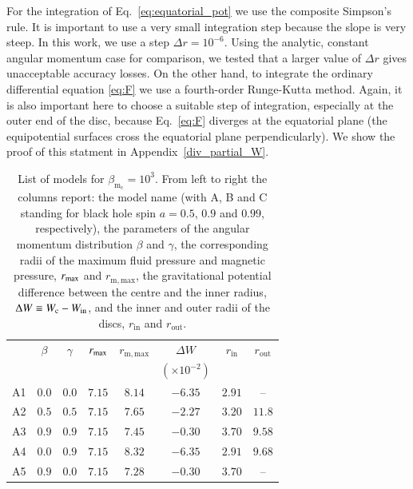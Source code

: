 \documentclass{aa}
\begin{document}
For the integration of Eq.~\eqref{eq:equatorial_pot} we use the composite Simpson's rule. It is important to use a very small integration step because the slope is very steep. In this work, we use a step $\Delta r = 10^{-6}$. Using the analytic, constant angular momentum case for comparison, we tested that 
a larger value of $\Delta r$ gives unacceptable accuracy losses. On the other hand, to integrate the ordinary differential equation \eqref{eq:F} we use a fourth-order Runge-Kutta method. Again, it is also important here to choose a suitable step of integration, especially at the outer end of the disc, because Eq.~\eqref{eq:F} diverges at the equatorial plane (the equipotential surfaces cross the equatorial plane perpendicularly). We show the proof of this statment in Appendix~\ref{div_partial_W}.

\begin{table}
\caption{List of models for $\beta_{\mathrm{m}_{\mathrm{c}}} = 10^{3}$. From left to right the columns report: the model name (with A, B and C standing for black hole spin $a = 0.5$, $0.9$ and $0.99$, respectively), the parameters of the angular momentum distribution $\beta$ and $\gamma$, the corresponding radii of the maximum fluid pressure and magnetic pressure, $r_{{\rm{max}}}$ and $r_{{\mathrm{m, max}}}$, the gravitational potential difference between the centre and the inner radius, $\Delta W\equiv W_{\rm c}-W_{\rm in}$, and the inner and outer radii of the discs, $r_{\mathrm{in}}$ and $r_{\mathrm{out}}$.}             
\label{table:1}      
\centering          
\begin{tabular}{c c c c  c c c c}
\hline\hline       
 & $\beta$ & $\gamma$ & $r_{\rm{max}}$ &  $r_{\mathrm{m, max}}$ & $\Delta W$               & $r_{\mathrm{in}}$ & $r_{\mathrm{out}}$ \\ 
 &              &                   &                          &                                        & $(\times 10^{-2})$     &                              &  \\
\hline           
A1 & $0.0$ & $0.0$ & $7.15$ &  $8.14$  & $-6.35$ & $2.91$ & -- \\ 
A2 & $0.5$ & $0.5$ & $7.15$ &  $7.65$  & $-2.27$ & $3.20$ & $11.8$\\ 
A3 & $0.9$ & $0.9$ & $7.15$ &  $7.45$  & $-0.30$ & $3.70$ &  $9.58$\\ 
A4 & $0.0$ & $0.9$ & $7.15$ &  $8.32$  & $-6.35$ & $2.91$ & $9.68$\\ 
A5 & $0.9$ & $0.0$ & $7.15$ &  $7.28$  & $-0.30$ & $3.70$ & --\\ 

\end{tabular}
\end{table}
\end{document}
